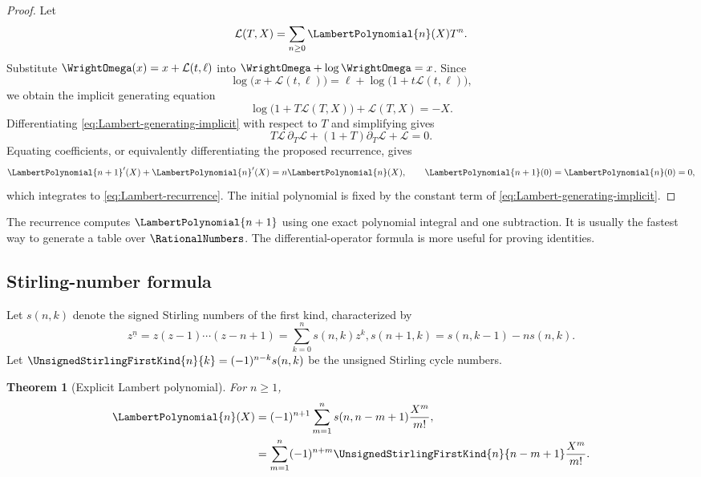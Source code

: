 \documentclass[11pt,oneside]{article}
\numberwithin{equation}{section}
\newtheorem{theorem}{Theorem}[section]
\theoremstyle{definition}
\begin{document}
\begin{proof}
Let
\begin{equation}\label{eq:Lambert-generating-F}
  \mathcal L(T,X)=\sum_{n\ge0}\LambertPolynomial{n}(X)T^n.
\end{equation}
Substitute \(\WrightOmega(x)=x+\mathcal L(t,\ell)\) into
\(\WrightOmega+\log\WrightOmega=x\).  Since
\[
  \log\bigl(x+\mathcal L(t,\ell)\bigr)
  =\ell+\log\bigl(1+t\mathcal L(t,\ell)\bigr),
\]
we obtain the implicit generating equation
\begin{equation}\label{eq:Lambert-generating-implicit}
\boxed{
  \log\bigl(1+T\mathcal L(T,X)\bigr)
  +\mathcal L(T,X)=-X.
}
\end{equation}
Differentiating \eqref{eq:Lambert-generating-implicit} with respect to \(T\)
and simplifying gives
\begin{equation}\label{eq:Lambert-generating-ODE}
  T\mathcal L\,\partial_T\mathcal L
  +(1+T)\partial_T\mathcal L+\mathcal L=0.
\end{equation}
Equating coefficients, or equivalently differentiating the proposed recurrence,
gives
\[
  {\LambertPolynomial{n+1}}'(X)+{\LambertPolynomial{n}}'(X)=n\LambertPolynomial{n}(X),
  \qquad \LambertPolynomial{n+1}(0)=\LambertPolynomial{n}(0)=0,
\]
which integrates to \eqref{eq:Lambert-recurrence}.  The initial polynomial is
fixed by the constant term of \eqref{eq:Lambert-generating-implicit}.
\end{proof}

The recurrence computes \(\LambertPolynomial{n+1}\) using one exact polynomial integral and one
subtraction.  It is usually the fastest way to generate a table over \(\RationalNumbers\).
The differential-operator formula is more useful for proving identities.

\subsection{Stirling-number formula}

Let \(s(n,k)\) denote the signed Stirling numbers of the first kind,
characterized by
\[
  z^{\underline n}=z(z-1)\cdots(z-n+1)
  =\sum_{k=0}^n s(n,k)z^k,
  s(n+1,k)=s(n,k-1)-n s(n,k).
\]
Let \(\UnsignedStirlingFirstKind{n}{k}=(-1)^{n-k}s(n,k)\) be the unsigned Stirling cycle
numbers.

\begin{theorem}[Explicit Lambert polynomial]\label{thm:Lambert-Stirling}
For \(n\ge1\),
\begin{align}
  \LambertPolynomial{n}(X)
  &=(-1)^{n+1}\sum_{m=1}^{n}
       s(n,n-m+1)\frac{X^m}{m!},
       \label{eq:Ln-signed-Stirling}\\
  &=\sum_{m=1}^{n}(-1)^{n+m}
       \UnsignedStirlingFirstKind{n}{n-m+1}\frac{X^m}{m!}.
       \label{eq:Ln-unsigned-Stirling}
\end{align}
\end{theorem}
\end{document}
